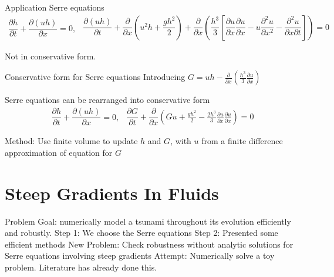 \documentclass[pdf]{beamer}
\begin{document}
\begin{frame}{Application}
	Serre equations
	\begin{subequations}
		\begin{gather*}
		\dfrac{\partial h}{\partial t} + \dfrac{\partial (uh)}{\partial x} = 0,
		\end{gather*}
		\begin{gather*}
		\dfrac{\partial (uh)}{\partial t} + \dfrac{\partial}{\partial x} \left ( u^2h + \dfrac{gh^2}{2}\right )+ \dfrac{\partial}{\partial x} \left (  \dfrac{h^3}{3} \left [ \dfrac{\partial u }{\partial x} \dfrac{\partial u}{\partial x} -u \dfrac{\partial^2 u}{\partial x^2}  - \dfrac{\partial^2 u}{\partial x \partial t}\right ] \right )= 0
		\end{gather*}
	\end{subequations}
	
	Not in conservative form.
\end{frame}

\begin{frame}{Conservative form for Serre equations}
	Introducing $G = uh - \frac{\partial}{\partial x}\left(\frac{h^3}{3}\frac{\partial u}{\partial x}\right)$
	
	Serre equations can be rearranged into conservative form
	\begin{subequations}
		\begin{gather*}
		\dfrac{\partial h}{\partial t} + \dfrac{\partial (uh)}{\partial x} = 0,
		\end{gather*}
		\begin{gather*}
		\dfrac{\partial G}{\partial t}+ \dfrac{\partial }{\partial x}\left(Gu + \frac{gh^2}{2} - \frac{2h^3}{3}\frac{\partial u}{\partial x}\frac{\partial u}{\partial x}\right)= 0
		\end{gather*}
	\end{subequations}
	
Method: Use finite volume to update $h$ and $G$, with $u$ from a finite difference approximation of equation for $G$\end{frame}


\section{Steep Gradients In Fluids}

\begin{frame}{Problem}
Goal: numerically model a tsunami throughout its evolution efficiently and robustly.
\vskip 0.2cm
Step 1: We choose the Serre equations 
\vskip 0.2cm
Step 2: Presented some efficient methods
\vskip 0.2cm
New Problem: Check robustness without analytic solutions for Serre equations involving steep gradients
\vskip 0.2cm
Attempt: Numerically solve a toy problem. Literature has already done this.

\end{frame}
\end{document}
